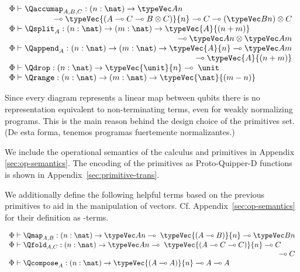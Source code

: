 \begin{center}
$
\begin{array}{l}
    \Phi\vdash \Qaccumap_{A,B,C} : (n:\nat) \to \typeVec A n \;\\
    \multicolumn{1}{r}{\multimap\typeVec{(A \multimap C \multimap B \otimes C)}{n} \multimap C \multimap (\typeVec B n) \otimes C} \\
    \Phi\vdash \Qsplit_A : (n:\nat) \to (m:\nat) \to \typeVec{A}{(n+m)} \\
    \multicolumn{1}{r}{\multimap \typeVec A n \otimes \typeVec A m}\\
    \Phi\vdash \Qappend_A : (n:\nat) \to (m:\nat) \to \typeVec{A}{n} \multimap \typeVec A m \\
    \multicolumn{1}{r}{\qquad\multimap \typeVec{A}{(n+m)}}\\
    \Phi\vdash \Qdrop : (n:\nat) \to \typeVec{\unit}{n} \multimap\; \unit \\
    \Phi\vdash \Qrange : (n:\nat)\to (m:\nat)\to \typeVec{\nat}{(m-n)} \\
\end{array}
$
\end{center}

Since every diagram represents a linear map between qubits there is no
representation equivalent to non-terminating terms, even for weakly normalizing
programs. This is the main reason behind the design choice of the primitives
set. {\color{red} (De esta forma, tenemos programas fuertemente normalizantes.)}
%

We include the operational semantics of the calculus and primitives in Appendix~
\ref{sec:op-semantics}. The encoding of the primitives as Proto-Quipper-D functions
is shown in Appendix~\ref{sec:primitive-trans}. 

We additionally define the following helpful terms based on the previous
primitives to aid in the manipulation of vectors.
Cf. Appendix~\ref{sec:op-semantics} for their definition as \lambdaD-terms.
\begin{center}
$
\begin{array}{l}
    \Phi\vdash \Qmap_{A,B} : (n:\nat) \to \typeVec A n \multimap\; \typeVec{(A \multimap B)}{n} \multimap \typeVec B n \\
    \Phi\vdash \Qfold_{A,C} : (n:\nat) \to \typeVec A n \multimap\; \typeVec{(A \multimap C \multimap C)}{n} \multimap C \\
    \multicolumn{1}{r}{\multimap C }\\
    \Phi\vdash \Qcompose_{A} : (n:\nat) \to \typeVec{(A \multimap A)}{n} \multimap A \multimap A \\
\end{array}
$
\end{center}


